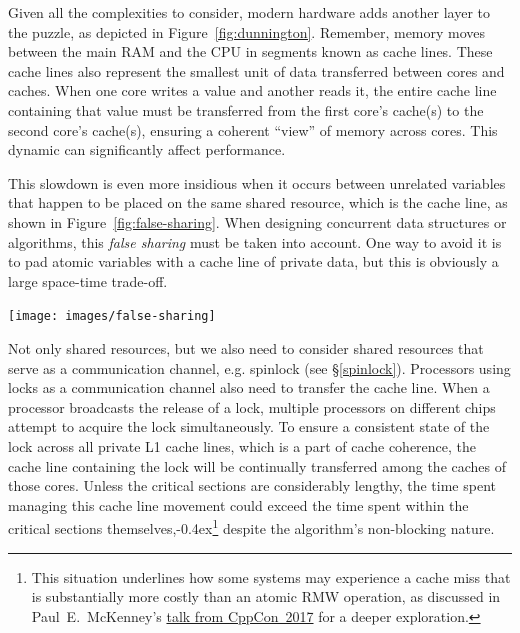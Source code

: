 \documentclass[fontsize=10pt, oneside]{scrartcl}
\newcommand{\punckern}{\kern-0.4ex}
\newcommand{\fig}[1]{Figure~\ref{#1}}
\newcommand{\introduce}[1]{\textit{#1}}
\newcommand{\secref}[1]{\hyperref[#1]{\textsc{\S}\ref*{#1}}}
\begin{document}
Given all the complexities to consider, modern hardware adds another layer to the puzzle, 
as depicted in \fig{fig:dunnington}. 
Remember, memory moves between the main \textsc{RAM} and the \textsc{CPU} in segments known as cache lines. 
These cache lines also represent the smallest unit of data transferred between cores and caches. 
When one core writes a value and another reads it, 
the entire cache line containing that value must be transferred from the first core's cache(s) to the second core's cache(s), 
ensuring a coherent ``view'' of memory across cores. This dynamic can significantly affect performance.

This slowdown is even more insidious when it occurs between unrelated variables that happen to be placed on the same shared resource, 
which is the cache line, as shown in \fig{fig:false-sharing}. 
When designing concurrent data structures or algorithms, 
this \introduce{false sharing} must be taken into account. 
One way to avoid it is to pad atomic variables with a cache line of private data, 
but this is obviously a large space-time trade-off.

\texttt{[image: images/false-sharing]}
\label{fig:false-sharing}

Not only shared resources, 
but we also need to consider shared resources that serve as a communication channel, e.g. spinlock (see \secref{spinlock}). 
Processors using locks as a communication channel also need to transfer the cache line.
When a processor broadcasts the release of a lock, 
multiple processors on different chips attempt to acquire the lock simultaneously. 
To ensure a consistent state of the lock across all private L1 cache lines, 
which is a part of cache coherence, 
the cache line containing the lock will be continually transferred among the caches of those cores.
Unless the critical sections are considerably lengthy, 
the time spent managing this cache line movement could exceed the time spent within the critical sections themselves,\punckern\footnote{%
This situation underlines how some systems may experience a cache miss that is substantially more costly than an atomic \textsc{RMW} operation,
as discussed in Paul~E.\ McKenney's
\href{https://www.youtube.com/watch?v=74QjNwYAJ7M}{talk from CppCon~2017}
for a deeper exploration.}
despite the algorithm's non-blocking nature.
\end{document}
